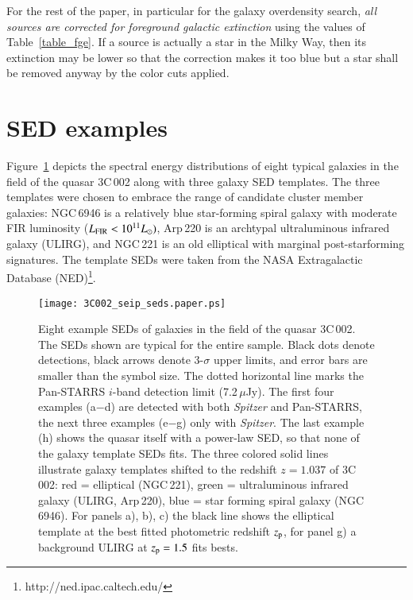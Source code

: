 \documentclass[mathleft,fleqn,%
]{an}
\begin{document}
For the rest of the paper, in particular for the galaxy overdensity
search, {\it all sources are corrected for foreground galactic 
extinction} using the values of Table~\ref{table_fge}. 
If a source is actually a star in the Milky Way, then its extinction
may be lower so that the 
correction makes it too blue but a star shall be removed anyway by 
the color cuts applied. 


\section{SED examples} \label{sec:sed_examples}


Figure~\ref{fig_seds_1} depicts the spectral energy distributions of
eight typical galaxies in the field of the quasar 3C\,002 along with
three galaxy SED templates. The three templates were chosen to embrace
the range of candidate 
cluster member galaxies: NGC\,6946 is a relatively blue star-forming
spiral galaxy with 
moderate FIR luminosity ($L_{\rm FIR} < 10^{11} L_{\odot})$, Arp\,220 is
an archtypal ultraluminous infrared galaxy (ULIRG), 
and NGC\,221 is an old elliptical with marginal post-starforming
signatures. The template SEDs were taken from the NASA Extragalactic
Database (NED)\footnote{http://ned.ipac.caltech.edu/}. 


\begin{figure*}
  \texttt{[image: 3C002\_seip\_seds.paper.ps]}
  \caption{Eight example SEDs of galaxies in the field of the quasar
    3C\,002.
    The SEDs
    shown are typical for the entire sample. 
    Black dots denote detections, black arrows denote 3-$\sigma$ upper
    limits, and error bars are smaller than the symbol
    size.
    The dotted horizontal line marks  the Pan-STARRS $i$-band detection limit
    (7.2\,$\mu$Jy).
    The first four examples (a$-$d) are detected with both {\it Spitzer} and
    Pan-STARRS, the next three examples (e$-$g) only with {\it
      Spitzer}. The
    last example (h) shows the quasar itself with a power-law SED, so that none of the galaxy template SEDs fits.
    The three colored solid lines illustrate galaxy templates shifted to
    the redshift $z=1.037$ of 3C\,002:
    red = elliptical (NGC\,221), 
    green = ultraluminous infrared galaxy (ULIRG, Arp\,220), 
    blue = star forming spiral galaxy (NGC\,6946).
    For panels a), b), c) the black line shows the elliptical template at the
    best fitted photometric redshift $z_{\rm p}$, for panel g) a
    background ULIRG at $z_{\rm p} = 1.5$ fits bests.
  }
  \label{fig_seds_1}
\end{figure*}
\end{document}
